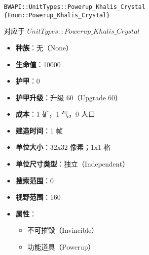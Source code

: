 \begin{tcolorbox}[colback=white, colframe=black!60!white, title=Powerup\_Khalis\_Crystal(), arc=0mm]
    \begin{verbatim}
BWAPI::UnitTypes::Powerup_Khalis_Crystal {Enum::Powerup_Khalis_Crystal}
    \end{verbatim}
    对应于  $UnitTypes::Powerup\_Khalis\_Crystal$ 
    \begin{itemize}
        \item \textbf{种族}：无（None）
        \item \textbf{生命值}：10000
        \item \textbf{护甲}：0
        \item \textbf{护甲升级}：升级 60（Upgrade 60）
        \item \textbf{成本}：1 矿，1 气，0 人口
        \item \textbf{建造时间}：1 帧
        \item \textbf{单位大小}：32x32 像素；1x1 格
        \item \textbf{单位尺寸类型}：独立（Independent）
        \item \textbf{搜索范围}：0
        \item \textbf{视野范围}：160
        \item \textbf{属性}：
            \begin{itemize}
                \item 不可摧毁（Invincible）
                \item 功能道具（Powerup）
            \end{itemize}
    \end{itemize}
\end{tcolorbox}

